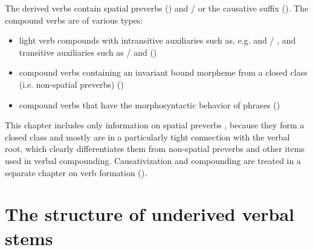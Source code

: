 The derived verbs contain spatial preverbs () and / or the causative suffix (). The compound verbs are of various types:
%
\begin{itemize}
	\item	light verb compounds with intransitive auxiliaries such as, e.g.   and  /  , and transitive auxiliaries such as  /   and   ()
	\item	compound verbs containing an invariant bound morpheme from a closed class (i.e. non-spatial preverbs) ()
	\item	compound verbs that have the morphosyntactic behavior of phrases ()
\end{itemize}

This chapter includes only information on spatial preverbs , because they form a closed class and mostly are in a particularly tight connection with the verbal root, which clearly differentiates them from non-spatial preverbs and other items used in verbal compounding. Causativization and compounding are treated in a separate chapter on verb formation ().


\section{The structure of underived verbal stems}
\label{sec:The structure underived verbal stems}

